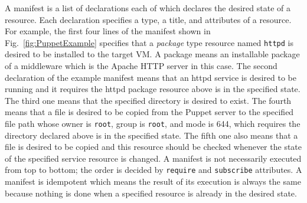 \documentclass[12pt]{report}
\begin{document}
A manifest is a list of declarations each of which declares the
desired state of a resource. Each declaration specifies a type, a
title, and attributes of a resource. For example, the first four lines
of the manifest shown in Fig.~\ref{fig:PuppetExample} specifies that a
{\it package} type resource named {\tt httpd} is desired to be installed to
the target VM. A package means an installable package of a middleware
which is the Apache HTTP server in this case.  The second declaration
of the example manifest means that an httpd service is desired to be
running and it requires the httpd package resource above is in the
specified state. The third one means that the specified directory is
desired to exist. The fourth means that a file is desired to be
copied from the Puppet server to the specified file path whose owner
is {\tt root}, group is {\tt root}, and mode is 644, which requires
the directory declared above is in the specified state.  The fifth one
also means that a file is desired to be copied and this resource
should be checked whenever the state of the specified service resource
is changed. A manifest is not necessarily executed from top to bottom;
the order is decided by {\tt require} and {\tt subscribe}
attributes. A manifest is idempotent which means the result of its
execution is always the same because nothing is done when a specified
resource is already in the desired state.
\end{document}
